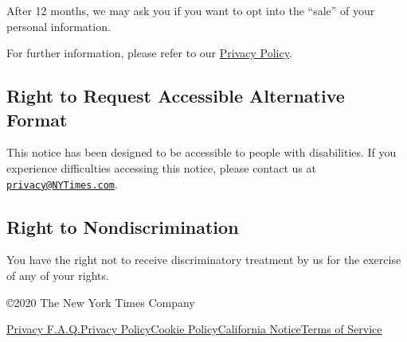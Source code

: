 After 12 months, we may ask you if you want to opt into the ``sale'' of
your personal information.

For further information, please refer to our
\href{http://www.nytimes3xbfgragh.onion/privacy/privacy-policy}{Privacy
Policy}.

\hypertarget{right-to-request-accessible-alternative-format}{%
\subsection{Right to Request Accessible Alternative
Format}\label{right-to-request-accessible-alternative-format}}

This notice has been designed to be accessible to people with
disabilities. If you experience difficulties accessing this notice,
please contact us at
\href{mailto:privacy@NYTimes.com}{\nolinkurl{privacy@NYTimes.com}}.

\hypertarget{right-to-nondiscrimination}{%
\subsection{Right to
Nondiscrimination}\label{right-to-nondiscrimination}}

You have the right not to receive discriminatory treatment by us for the
exercise of any of your rights.

©2020 The New York Times Company

\href{/privacy}{Privacy F.A.Q.}\href{/privacy/privacy-policy}{Privacy
Policy}\href{/privacy/cookie-policy}{Cookie
Policy}\href{/privacy/california-notice}{California
Notice}\href{https://help.nytimes3xbfgragh.onion/hc/en-us/articles/115014893428-Terms-of-service}{Terms
of Service}
